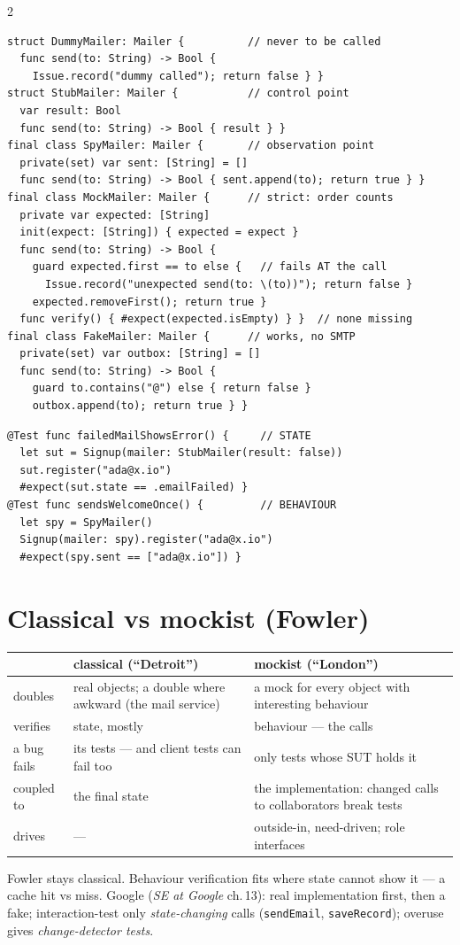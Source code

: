 \documentclass[8pt]{extarticle}
\newcommand\ct[1]{\texttt{#1}}
\begin{document}
\begin{multicols}{2}
\begin{lstlisting}[language=SwiftSheet]
struct DummyMailer: Mailer {          // never to be called
  func send(to: String) -> Bool {
    Issue.record("dummy called"); return false } }
struct StubMailer: Mailer {           // control point
  var result: Bool
  func send(to: String) -> Bool { result } }
final class SpyMailer: Mailer {       // observation point
  private(set) var sent: [String] = []
  func send(to: String) -> Bool { sent.append(to); return true } }
final class MockMailer: Mailer {      // strict: order counts
  private var expected: [String]
  init(expect: [String]) { expected = expect }
  func send(to: String) -> Bool {
    guard expected.first == to else {   // fails AT the call
      Issue.record("unexpected send(to: \(to))"); return false }
    expected.removeFirst(); return true }
  func verify() { #expect(expected.isEmpty) } }  // none missing
final class FakeMailer: Mailer {      // works, no SMTP
  private(set) var outbox: [String] = []
  func send(to: String) -> Bool {
    guard to.contains("@") else { return false }
    outbox.append(to); return true } }
\end{lstlisting}
\begin{lstlisting}[language=SwiftSheet]
@Test func failedMailShowsError() {     // STATE
  let sut = Signup(mailer: StubMailer(result: false))
  sut.register("ada@x.io")
  #expect(sut.state == .emailFailed) }
@Test func sendsWelcomeOnce() {         // BEHAVIOUR
  let spy = SpyMailer()
  Signup(mailer: spy).register("ada@x.io")
  #expect(spy.sent == ["ada@x.io"]) }
\end{lstlisting}

\columnbreak

\section{Classical vs mockist (Fowler)}
{\scriptsize\setlength{\tabcolsep}{2pt}
\begin{tabular}{@{}>{\raggedright\arraybackslash}p{11mm}>{\raggedright\arraybackslash}p{32mm}>{\raggedright\arraybackslash}p{33mm}@{}}
\toprule
& \textbf{classical (``Detroit'')} & \textbf{mockist (``London'')}\\
\midrule
doubles & real objects; a double where awkward (the mail service) & a mock for every object with interesting behaviour\\
verifies & state, mostly & behaviour — the calls\\
a bug fails & its tests — and client tests can fail too & only tests whose SUT holds it\\
coupled to & the final state & the implementation: changed calls to collaborators break tests\\
drives & — & outside-in, need-driven; role interfaces\\
\bottomrule
\end{tabular}}\par
Fowler stays classical. Behaviour verification fits where state cannot show it — a cache hit vs
miss. Google (\emph{SE at Google} ch.\,13): real implementation first, then a fake; interaction-test
only \emph{state-changing} calls (\ct{sendEmail}, \ct{saveRecord}); overuse gives
\emph{change-detector tests}.


\end{multicols}
\end{document}
